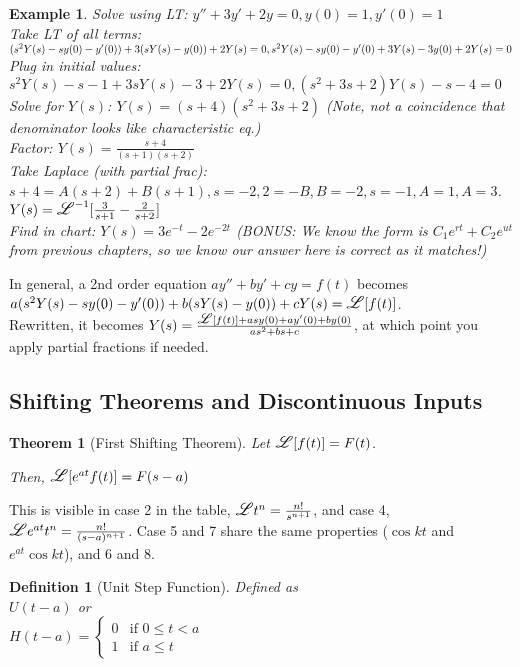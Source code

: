 \documentclass{article}
\newtheorem{definition}{Definition}
\newtheorem{theorem}{Theorem}
\newtheorem{example}{Example}
\newcommand\laplace{\mathlarger{\mathlarger{\mathscr{L}}}}
\begin{document}
\begin{example} 
	Solve using LT: $y''+3y'+2y=0, y(0)=1, y'(0)=1$\\
	Take LT of all terms: $(s^2Y(s)-sy(0)-y'(0))+3(sY(s)-y(0))+2Y(s)=0, 
	\\s^2Y(s)-sy(0)-y'(0)+3Y(s)-3y(0)+2Y(s)=0$\\
	Plug in initial values: $s^2Y(s)-s-1+3sY(s)-3+2Y(s)=0, (s^2+3s+2)Y(s)-s-4=0$\\
	Solve for $Y(s)$: $Y(s)=(s+4)(s^2+3s+2)$ (Note, not a coincidence that denominator looks like characteristic eq.)\\
	Factor: $Y(s)=\frac{s+4}{(s+1)(s+2)}$\\
	Take Laplace (with partial frac): $s+4=A(s+2)+B(s+1), s=-2, 2=-B,B=-2, s=-1, A=1, A=3$.\\
	$Y(s)=\laplace^{-1}[\frac{3}{s+1}-\frac{2}{s+2}]$\\
	Find in chart: $Y(s)=3e^{-t}-2e^{-2t}$ (BONUS: We know the form is $C_1e^{rt}+C_2e^{ut}$ from previous chapters, so we know our answer here is correct as it matches!)
\end{example}

In general, a 2nd order equation $ay''+by'+cy=f(t)$ becomes $a(s^2Y(s)-sy(0)-y'(0))+b(sY(s)-y(0))+cY(s)=\laplace[f(t)]$.\\
Rewritten, it becomes $Y(s)=\frac{\laplace[f(t)]+asy(0)+ay'(0)+by(0)}{as^2+bs+c}$, at which point you apply partial fractions if needed.

\subsection{Shifting Theorems and Discontinuous Inputs}


\begin{theorem}[First Shifting Theorem]
	Let $\laplace[f(t)]=F(t)$.

	Then, $\laplace[e^{at}f(t)]=F(s-a)$
\end{theorem}

This is visible in case 2 in the table, $\laplace{t^n}=\frac{n!}{s^{n+1}}$, and case 4, $\laplace{e^{at}t^n}=\frac{n!}{(s-a)^{n+1}}$.
Case 5 and 7 share the same properties ($\cos{kt}$ and $e^{at}\cos{kt}$), and 6 and 8.

\begin{definition} [Unit Step Function]
	
	Defined as \\$U(t-a)$ or \\$H(t-a)=\begin{cases}
		0 & \text{if $0\leq t<a$}\\
		1 & \text{if $a \leq t$}

	\end{cases}$
\end{definition}
\end{document}
